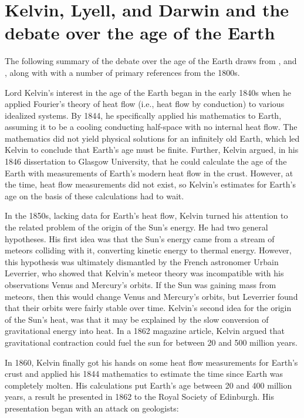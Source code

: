 \documentclass[12pt]{article}
\begin{document}
\section{Kelvin, Lyell, and Darwin and the debate over the age of the Earth} \label{sec:2}

The following summary of the debate over the age of the Earth draws from \citet{Lindley_2004}, \citet{Gould_1987} and \citet{Hallam_1989}, along with with a number of primary references from the 1800s.

Lord Kelvin's interest in the age of the Earth began in the early 1840s when he applied Fourier's theory of heat flow (i.e., heat flow by conduction) to various idealized systems. By 1844, he specifically applied his mathematics to Earth, assuming it to be a cooling conducting half-space with no internal heat flow. The mathematics did not yield physical solutions for an infinitely old Earth, which led Kelvin to conclude that Earth's age must be finite. Further, Kelvin argued, in his 1846 dissertation to Glasgow University, that he could calculate the age of the Earth with measurements of Earth's modern heat flow in the crust. However, at the time, heat flow measurements did not exist, so Kelvin's estimates for Earth's age on the basis of these calculations had to wait.

In the 1850s, lacking data for Earth's heat flow, Kelvin turned his attention to the related problem of the origin of the Sun's energy. He had two general hypotheses. His first idea was that the Sun's energy came from a stream of meteors colliding with it, converting kinetic energy to thermal energy. However, this hypothesis was ultimately dismantled by the French astronomer Urbain Leverrier, who showed that Kelvin's meteor theory was incompatible with his observations Venus and Mercury's orbits. If the Sun was gaining mass from meteors, then this would change Venus and Mercury's orbits, but Leverrier found that their orbits were fairly stable over time. Kelvin's second idea for the origin of the Sun's heat, was that it may be explained by the slow conversion of gravitational energy into heat. In a 1862 magazine article, Kelvin argued that gravitational contraction could fuel the sun for between 20 and 500 million years.

In 1860, Kelvin finally got his hands on some heat flow measurements for Earth's crust and applied his 1844 mathematics to estimate the time since Earth was completely molten. His calculations put Earth's age between 20 and 400 million years, a result he presented in 1862 to the Royal Society of Edinburgh. His presentation began with an attack on geologists: 
\end{document}
